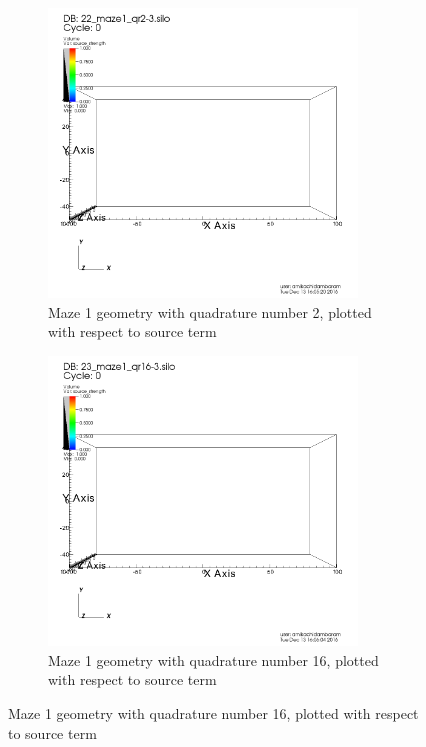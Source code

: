 \documentclass[10pt]{article}
\begin{document}
\begin{figure}[!ht]
\begin{subfigure}{0.49\textwidth}
\includegraphics[width = 0.9\textwidth]{visit/source-term-maze1-02}
\caption{Maze 1 geometry with quadrature number 2, plotted with respect to source term}
\label{visit:source-term-maze1-02}
\end{subfigure}
\hfill
\begin{subfigure}{0.49\textwidth}
\includegraphics[width = 0.9\textwidth]{visit/source-term-maze1-16}
\caption{Maze 1 geometry with quadrature number 16, plotted with respect to source term}
\label{visit:source-term-maze1-16}
\end{subfigure}


\end{figure}
\end{document}
